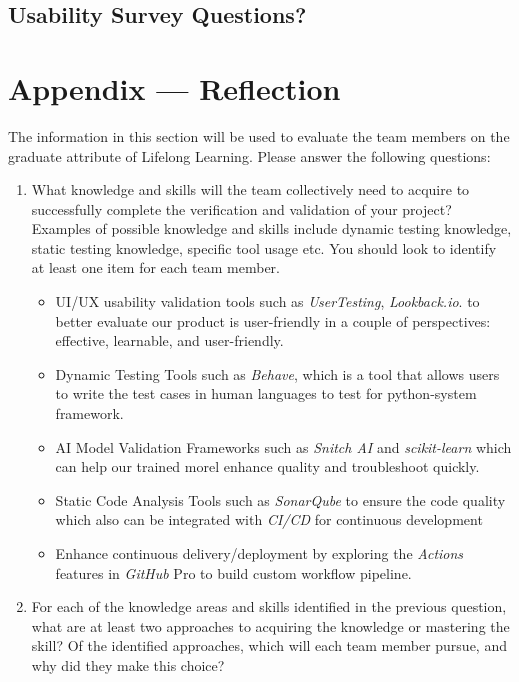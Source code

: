 \documentclass[12pt, titlepage]{article}
\begin{document}
\subsection{Usability Survey Questions?}



\newpage{}
\section*{Appendix --- Reflection}

The information in this section will be used to evaluate the team members on the
graduate attribute of Lifelong Learning.  Please answer the following questions:


\begin{enumerate}
  \item What knowledge and skills will the team collectively need to acquire to
  successfully complete the verification and validation of your project?
  Examples of possible knowledge and skills include dynamic testing knowledge,
  static testing knowledge, specific tool usage etc.  You should look to
  identify at least one item for each team member.


  \begin{itemize}
    \item UI/UX usability validation tools such  as \textit{UserTesting}, \textit{Lookback.io}. to better evaluate our product is user-friendly in a couple of perspectives: effective, learnable, and user-friendly.
    \item Dynamic Testing Tools such as \textit{Behave}, which is a tool that allows users to write the test cases in human languages to test for python-system framework. 
    \item AI Model Validation Frameworks such as \textit{Snitch AI} and \textit{scikit-learn} which can help our trained morel enhance quality and troubleshoot quickly.
    \item Static Code Analysis Tools such as \textit{SonarQube} to ensure the code quality which also can be integrated with \textit{CI/CD} for continuous development
    \item Enhance continuous delivery/deployment by exploring the \textit{Actions} features in \textit{GitHub} Pro to build custom workflow pipeline.
   \end{itemize} 


  \item For each of the knowledge areas and skills identified in the previous
  question, what are at least two approaches to acquiring the knowledge or
  mastering the skill?  Of the identified approaches, which will each team
  member pursue, and why did they make this choice?



\end{enumerate}
\end{document}
